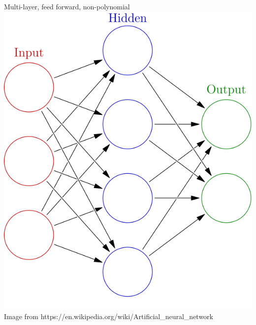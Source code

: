 \begin{frame}{Multi-layer, feed forward, non-polynomial}
		\includegraphics[width=.4\textwidth, center]{figuras/Colored_neural_network_1_hidden.png}
		\tiny{Image from https://en.wikipedia.org/wiki/Artificial\_neural\_network }	
\end{frame}

